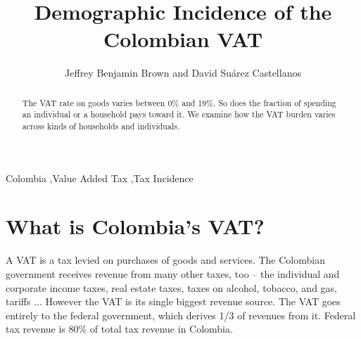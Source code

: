 \documentclass[preprint,12pt]{elsarticle}
\begin{document}
\begin{frontmatter}


\title{Demographic Incidence of the Colombian VAT}



\author{Jeffrey Benjamin Brown and David Suárez Castellanos}

\address{Observatorio Fiscal
  \\ Pontificia Universidad Javeriana
  \\ Bogotá, Colombia}

\begin{abstract}
The VAT rate on goods varies between 0\% and 19\%. So does the fraction of spending an individual or a household pays toward it. We examine how the VAT burden varies across kinds of households and individuals.
\end{abstract}

\begin{keyword}
Colombia \sep Value Added Tax \sep Tax Incidence
\end{keyword}

\end{frontmatter}


\section{What is Colombia's VAT?}

A VAT is a tax levied on purchases of goods and services. The Colombian government receives revenue from many other taxes, too -- the individual and corporate income taxes, real estate taxes, taxes on alcohol, tobacco, and gas, tariffs ... However the VAT is its single biggest revenue source. The VAT goes entirely to the federal government, which derives 1/3 of revenues from it. Federal tax revenue is 80\% of total tax revenue in Colombia.
\\
\end{document}
